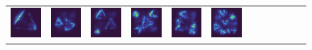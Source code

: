 \documentclass[letterpaper]{article} %
\begin{document}
\begin{figure}[!htbp]
\begin{tabular}{cccccccccccc}
\multicolumn{1}{c}{\includegraphics[width=0.125\columnwidth]{saliency/hrr/circle/triangle_1.png}} \hspace{-12pt} &
\multicolumn{1}{c}{\includegraphics[width=0.125\columnwidth]{saliency/hrr/circle/triangle_2.png}} \hspace{-12pt} &
\multicolumn{1}{c}{\includegraphics[width=0.125\columnwidth]{saliency/hrr/circle/triangle_3.png}} \hspace{-12pt} &
\multicolumn{1}{c}{\includegraphics[width=0.125\columnwidth]{saliency/hrr/circle/triangle_4.png}} \hspace{-12pt} &
\multicolumn{1}{c}{\includegraphics[width=0.125\columnwidth]{saliency/hrr/circle/triangle_5.png}} \hspace{-12pt} &
\multicolumn{1}{c}{\includegraphics[width=0.125\columnwidth]{saliency/hrr/circle/triangle_6.png}} \hspace{-12pt} &

\end{tabular}
\end{figure}
\end{document}
